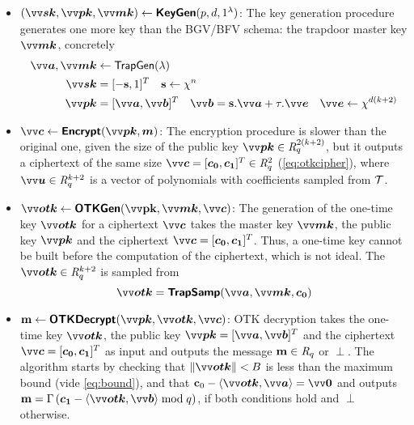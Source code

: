 \begin{itemize}[label={--}]
    \item $(\pv{sk},\pv{pk}, \pv{mk}) \from \bkw{KeyGen}(p, d, 1^\lambda)$: The key generation procedure generates one more key than the BGV/BFV schema: the trapdoor master key $\pv{mk}$, concretely
    \begin{equation*}
    \begin{split}
        \pv{a}, \pv{mk} &\from \textsf{TrapGen}(\lambda)\\
        \pv{sk}&=[-\ps,1]^T\quad \ps \from \chi^n \\
        \pv{pk}&=[\pv{a},\pv{b}]^T\quad \pv{b}=\ps.\pv{a}+\tau.\pv{e} \quad \pv{e} \from \chi^{d(k+2)}\\
    \end{split}
    \end{equation*}
    \item $\pv{c} \from \bkw{Encrypt}(\pv{pk},\p{m})$: The encryption procedure is slower than the original one, given the size of the public key $\pv{pk} \in \intring_q^{2(k+2)}$, but it outputs a ciphertext of the same size $\pv{c}=[\p{c_0},\p{c_1}]^T \in \intring_q^2$ (\cref{eq:otkcipher}), where $\pv{u} \in \intring_q^{k+2}$ is a vector of polynomials with coefficients sampled from $\mathcal{T}$.
    \item $\pv{otk} \from \bkw{OTKGen}(\mathbf{\pv{pk}},\pv{mk},\pv{c})$: The generation of the one-time key $\pv{otk}$ for a ciphertext $\pv{c}$ takes the master key $\pv{mk}$, the public key $\pv{pk}$ and the ciphertext $\pv{c}=[\p{c_0},\p{c_1}]^T$. Thus, a one-time key cannot be built before the computation of the ciphertext, which is not ideal. The $\pv{otk} \in \intring_q^{k+2}$ is sampled from 
    \begin{equation*}
        \pv{otk}=\bkw{TrapSamp}(\pv{a},\pv{mk},\p{c_0})
    \end{equation*}   
    \item $\ppm \from \bkw{OTKDecrypt}(\pv{pk},\pv{otk},\pv{c})$: OTK decryption takes the one-time key $\pv{otk}$, the public key $\pv{pk}=[\pv{a},\pv{b}]^T$ and the ciphertext $\pv{c}=[\p{c_0},\p{c_1}]^T$ as input and outputs the message $\mathbf{m} \in \mathit{R}_q$ or $\perp$. The algorithm starts by checking that $\|\pv{otk}\| < B$ is less than the maximum bound (vide \cref{eq:bound}), and that $\pc_0-\inprod{\pv{otk}}{\pv{a}}=\pv{0}$ and outputs $\ppm=\Gamma\left(\p{c_1} - \inprod{\pv{otk}}{\pv{b}} \bmod q\right)$, if both conditions hold and $\perp$ otherwise.
\end{itemize}

